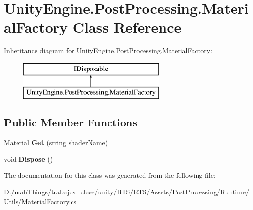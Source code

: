 \hypertarget{class_unity_engine_1_1_post_processing_1_1_material_factory}{}\section{Unity\+Engine.\+Post\+Processing.\+Material\+Factory Class Reference}
\label{class_unity_engine_1_1_post_processing_1_1_material_factory}
Inheritance diagram for Unity\+Engine.\+Post\+Processing.\+Material\+Factory\+:\begin{figure}[H]
\begin{center}
\leavevmode
\includegraphics[height=2.000000cm]{class_unity_engine_1_1_post_processing_1_1_material_factory}
\end{center}
\end{figure}
\subsection*{Public Member Functions}
\begin{DoxyCompactItemize}
\item 
\mbox{\label{class_unity_engine_1_1_post_processing_1_1_material_factory_a0805118c985df795d8b2941f30e3845d}} 
Material {\bfseries Get} (string shader\+Name)
\item 
\mbox{\label{class_unity_engine_1_1_post_processing_1_1_material_factory_a5fe3244955fe950b377611e57b2f10ae}} 
void {\bfseries Dispose} ()
\end{DoxyCompactItemize}


The documentation for this class was generated from the following file\+:\begin{DoxyCompactItemize}
\item 
D\+:/mah\+Things/trabajos\+\_\+clase/unity/\+R\+T\+S/\+R\+T\+S/\+Assets/\+Post\+Processing/\+Runtime/\+Utils/Material\+Factory.\+cs\end{DoxyCompactItemize}
